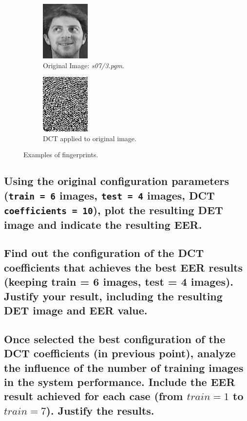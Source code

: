 \documentclass[a4paper]{article}
\def\inline{\lstinline[basicstyle=\ttfamily,keywordstyle={}]}
\begin{document}
\begin{figure}[H]
  \centering
       \begin{subfigure}[t]{0.45\textwidth}
         \centering
         \includegraphics{Figures/Original}
         \caption{Original Image: \emph{s07/3.pgm}.}
     \end{subfigure}%
     \quad
     \begin{subfigure}[t]{0.45\textwidth}
         \centering
         \includegraphics{Figures/Original-DCT}
         \caption{DCT applied to original image.}
     \end{subfigure}
    \caption{Examples of fingerprints.}
    \label{fig:ex1a}
\end{figure}


\subsection{Using the original configuration parameters (\inline{train = 6} images, \inline{test = 4} images, DCT \inline{coefficients = 10}), plot the resulting DET image and indicate the resulting EER.}






\subsection{Find out the configuration of the DCT coefficients that achieves the best EER results (keeping train = 6 images, test = 4 images). Justify your result, including the resulting DET image and EER value.}







\subsection{ Once selected the best configuration of the DCT coefficients (in previous point), analyze the influence of the number of training images in the system performance. Include the EER result achieved for each case (from \(train = 1\) to \(train = 7\)). Justify the results.}
\end{document}
